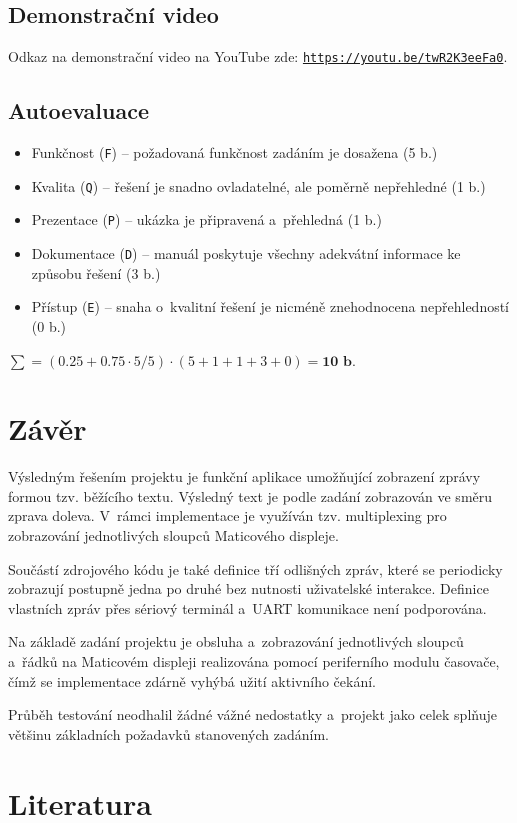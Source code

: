 \documentclass[a4paper, 11pt]{article}
\begin{document}
\subsection{Demonstrační video}
    Odkaz na demonstrační video na YouTube zde: \href{https://youtu.be/twR2K3eeFa0}{\texttt{https://youtu.be/twR2K3eeFa0}}.

\subsection{Autoevaluace}
    \begin{itemize}
        \item Funkčnost (\texttt{F}) -- požadovaná funkčnost zadáním je dosažena (5 b.)
        \item Kvalita (\texttt{Q}) -- řešení je snadno ovladatelné, ale poměrně nepřehledné (1 b.)
        \item Prezentace (\texttt{P}) -- ukázka je připravená a~přehledná (1 b.)
        \item Dokumentace (\texttt{D}) -- manuál poskytuje všechny adekvátní informace ke způsobu řešení (3 b.)
        \item Přístup (\texttt{E}) -- snaha o~kvalitní řešení je nicméně znehodnocena nepřehledností (0 b.)
    \end{itemize}

    \begin{center}
        $\sum = (0.25 + 0.75 \cdot 5/5) \cdot (5 + 1 + 1 + 3 + 0) = \textbf{10 b.}$
    \end{center}

\newpage

\section{Závěr}
    Výsledným řešením projektu je funkční aplikace umožňující zobrazení zprávy formou tzv. běžícího textu.
    Výsledný text je podle zadání zobrazován ve směru zprava doleva.
    V~rámci implementace je využíván tzv. multiplexing pro zobrazování jednotlivých sloupců Maticového displeje.

    Součástí zdrojového kódu je také definice tří odlišných zpráv, které se periodicky zobrazují postupně jedna po druhé bez nutnosti uživatelské interakce.
    Definice vlastních zpráv přes sériový terminál a~UART komunikace není podporována.

    Na základě zadání projektu je obsluha a~zobrazování jednotlivých sloupců a~řádků na Maticovém displeji realizována pomocí periferního modulu časovače, čímž se implementace zdárně vyhýbá užití aktivního čekání.

    Průběh testování neodhalil žádné vážné nedostatky a~projekt jako celek splňuje většinu základních požadavků stanovených zadáním.

\newpage

\section{Literatura}

\renewcommand{\refname}{}

\end{document}
